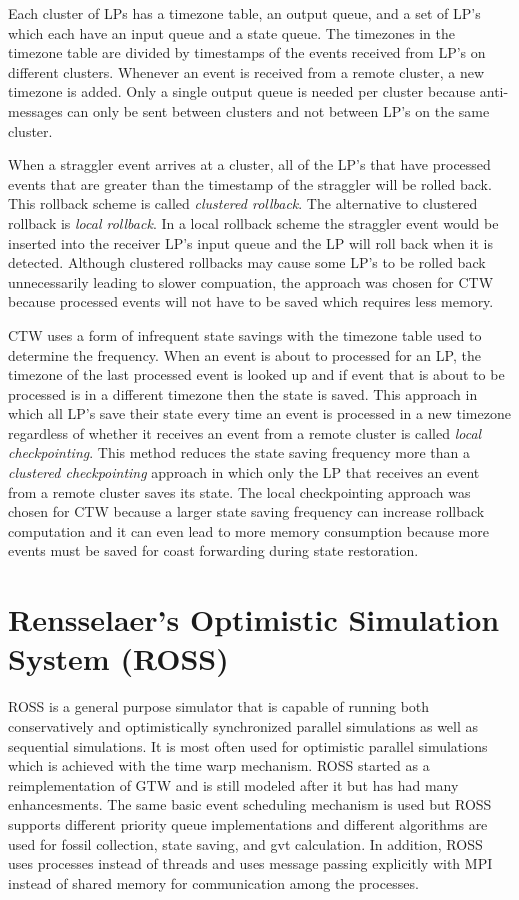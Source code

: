 \documentclass[11pt]{book}
\begin{document}
Each cluster of LPs has a timezone table, an output queue, and a set of LP's which each have an
input queue and a state queue. The timezones in the timezone table are divided by timestamps
of the events received from LP's on different clusters. Whenever an event is received from
a remote cluster, a new timezone is added. Only a single output queue is needed per cluster
because anti-messages can only be sent between clusters and not between LP's on the same
cluster.

When a straggler event arrives at a cluster, all of the LP's that have processed events that
are greater than the timestamp of the straggler will be rolled back. This rollback scheme is
called \emph{clustered rollback}. The alternative to clustered rollback is \emph{local
rollback}. In a local rollback scheme the straggler event would be inserted into the receiver
LP's input queue and the LP will roll back when it is detected. Although clustered rollbacks
may cause some LP's to be rolled back unnecessarily leading to slower compuation, the
approach was chosen for CTW because processed events will not have to be saved which
requires less memory.

CTW uses a form of infrequent state savings with the timezone table used to determine the
frequency. When an event is about to processed for an LP, the timezone of the last processed
event is looked up and if event that is about to be processed is in a different timezone then
the state is saved. This approach in which all LP's save their state every time an event is
processed in a new timezone regardless of whether it receives an event from a remote cluster
is called \emph{local checkpointing}. This method reduces the state saving frequency more
than a \emph{clustered checkpointing} approach in which only the LP that receives an event
from a remote cluster saves its state. The local checkpointing approach was chosen for CTW
because a larger state saving frequency can increase rollback computation and it can even
lead to more memory consumption because more events must be saved for coast forwarding
during state restoration.

\section{Rensselaer's Optimistic Simulation System (ROSS)}

ROSS\cite{carothers-00} is a general purpose simulator that is capable of running both
conservatively and optimistically synchronized parallel simulations as well as sequential
simulations. It is most often used for optimistic parallel simulations which is achieved
with the time warp mechanism. ROSS started as a reimplementation of GTW and is still
modeled after it but has had many enhancesments. The same basic event scheduling mechanism is
used but ROSS supports different priority queue implementations and different algorithms
are used for fossil collection, state saving, and gvt calculation. In addition, ROSS uses
processes instead of threads and uses message passing explicitly with MPI instead of shared
memory for communication among the processes.
\end{document}
